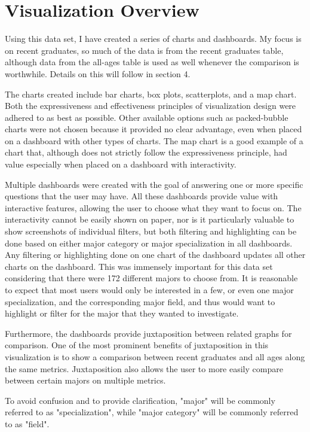 \documentclass[sigchi]{acmart}
\begin{document}
\section{Visualization Overview}

Using this data set, I have created a series of charts and dashboards. My focus is on recent graduates, so much of the data is from the recent graduates table, although data from the all-ages table is used as well whenever the comparison is worthwhile. Details on this will follow in section 4.

The charts created include bar charts, box plots, scatterplots, and a map chart. Both the expressiveness and effectiveness principles of visualization design \cite{munzner} were adhered to as best as possible. Other available options such as packed-bubble charts were not chosen because it provided no clear advantage, even when placed on a dashboard with other types of charts. The map chart is a good example of a chart that, although does not strictly follow the expressiveness principle, had value especially when placed on a dashboard with interactivity.

Multiple dashboards were created with the goal of answering one or more specific questions that the user may have. All these dashboards provide value with interactive features, allowing the user to choose what they want to focus on. The interactivity cannot be easily shown on paper, nor is it particularly valuable to show screenshots of individual filters, but both filtering and highlighting can be done based on either major category or major specialization in all dashboards. Any filtering or highlighting done on one chart of the dashboard updates all other charts on the dashboard. This was immensely important for this data set considering that there were 172 different majors to choose from. It is reasonable to expect that most users would only be interested in a few, or even one major specialization, and the corresponding major field, and thus would want to highlight or filter for the major that they wanted to investigate.

Furthermore, the dashboards provide juxtaposition between related graphs for comparison. One of the most prominent benefits of juxtaposition in this visualization is to show a comparison between recent graduates and all ages along the same metrics. Juxtaposition also allows the user to more easily compare between certain majors on multiple metrics.

To avoid confusion and to provide clarification, "major" will be commonly referred to as "specialization", while "major category" will be commonly referred to as "field".
\end{document}
